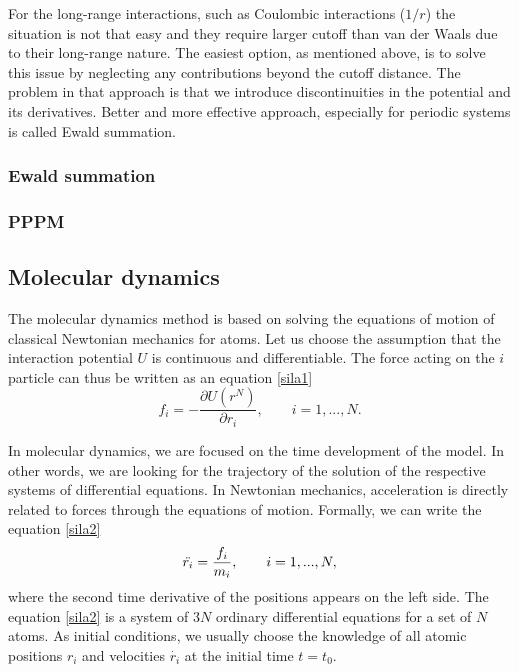 For the long-range interactions, such as Coulombic interactions ($1/r$) the situation is not that easy and they require larger cutoff than van der Waals due to their long-range nature. The easiest option, as mentioned above, is to solve this issue by neglecting any contributions beyond the cutoff distance. The problem in that approach is that we introduce discontinuities in the potential and its derivatives. Better and more effective approach, especially for periodic systems is called Ewald summation.

\subsubsection{Ewald summation}

\subsubsection{PPPM}


\subsection{Molecular dynamics}
The molecular dynamics method is based on solving the equations of motion of classical Newtonian mechanics for atoms. Let us choose the assumption that the interaction potential $U$ is continuous and differentiable. The force acting on the $i$ particle can thus be written as an equation \ref{sila1} 
\begin{equation}\label{sila1}
	f_i=-\frac{\partial U(r^N)}{\partial r_i}, \qquad i=1,...,N.
\end{equation}

In molecular dynamics, we are focused on the time development of the model. In other words, we are looking for the trajectory of the solution of the respective systems of differential equations. In Newtonian mechanics, acceleration is directly related to forces through the equations of motion. Formally, we can write the equation \ref{sila2}
\begin{equation}\label{sila2}
	\Ddot{r_i}=\frac{f_i}{m_i}, \qquad i=1,...,N,
\end{equation}
where the second time derivative of the positions appears on the left side. The equation \ref{sila2} is a system of 3$N$ ordinary differential equations for a set of $N$ atoms. As initial conditions, we usually choose the knowledge of all atomic positions $r_i$ and velocities $\dot{r_i}$ at the initial time $t=t_0$. 

